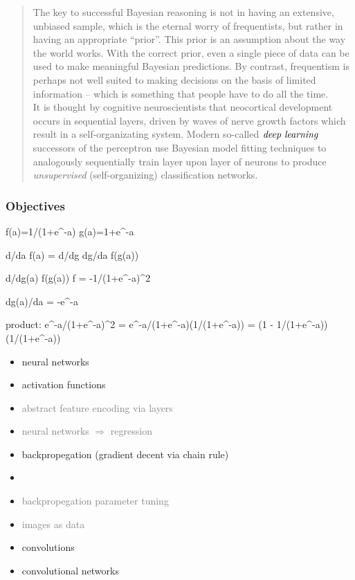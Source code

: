 \documentclass[xcolor={dvipsnames}]{beamer}
\begin{document}
{{{\begin{quote}
The key to successful Bayesian reasoning is not in having an extensive, unbiased sample, which is the eternal worry of frequentists, but rather in having an appropriate ``prior''. This prior is an assumption about the way the world works. 
With the correct prior, even a single piece of data can be used to make meaningful Bayesian predictions. By contrast, 
frequentism is perhaps not well suited to making decisions on the basis of limited information -- which is something that people have to do all the time.  \\
\hspace{1.5em} It is thought by cognitive neuroscientists that neocortical development occurs in sequential layers, driven by waves of nerve growth factors which result in a self-organizating system. 
Modern so-called $\textrm{\emph{deep learning}}$ successors of the perceptron use
 Bayesian model fitting techniques to analogously sequentially train layer upon layer of neurons 
to produce \emph{unsupervised} (self-organizing) classification networks. 


\end{quote}
}
}
}



\frame
{
\frametitle{Objectives}

f(a)=1/(1+e^-a)
g(a)=1+e^-a

d/da f(a) = d/dg dg/da f(g(a)) 

d/dg(a) f(g(a)) 
f = -1/(1+e^-a)^2

dg(a)/da = -e^-a 

product:
e^-a/(1+e^-a)^2
= e^-a/(1+e^-a)(1/(1+e^-a))
= (1 - 1/(1+e^-a)) (1/(1+e^-a))



\begin{itemize}
\item neural networks
\item activation functions
\item \textcolor{gray}{abstract feature encoding via layers}
\item \textcolor{gray}{neural networks $\Longrightarrow$ regression}
\item backpropegation (gradient decent via chain rule) 
\item[]
\item \textcolor{gray}{backpropegation parameter tuning}
\item \textcolor{gray}{images as data}
\item convolutions
\item convolutional networks
\end{itemize}

}
\end{document}
